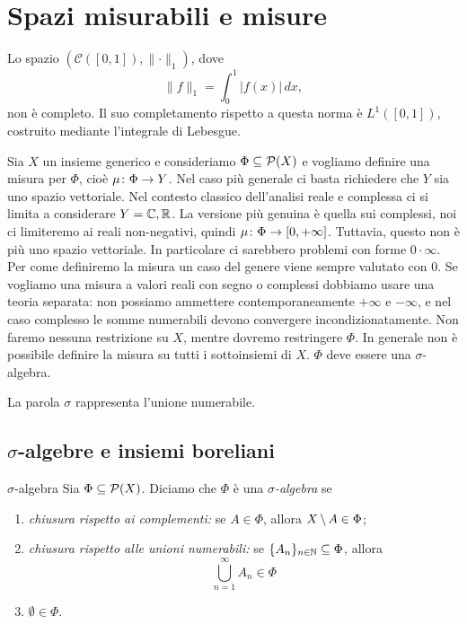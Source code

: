 \documentclass[a4paper]{article}
\begin{document}
\section{Spazi misurabili e misure}

\begin{radioactive}
Lo spazio \((\mathcal C([0,1]), \lVert\cdot\rVert_1)\), dove
\[
    \lVert f\rVert_1 = \int_0^1 |f(x)|\,dx,
\]
non è completo. Il suo completamento rispetto a questa norma è
\(L^1([0,1])\), costruito mediante l'integrale di Lebesgue.

Sia \(X\) un insieme generico e consideriamo \(\Phi \subseteq \mathcal P(X)\)
e vogliamo definire una misura per \(\Phi\), cioè \(\mu \colon \Phi \to Y\).
Nel caso più generale ci basta richiedere che \(Y\) sia uno spazio vettoriale.
Nel contesto classico dell'analisi reale e complessa ci si limita a considerare
\(Y = \mathbb{C}, \mathbb{R}\).
La versione più genuina è quella sui complessi, noi ci limiteremo ai reali non-negativi,
quindi \(\mu \colon \Phi \to [0,+\infty]\).
Tuttavia, questo non è più uno spazio vettoriale.
In particolare ci sarebbero problemi con forme \(0 \cdot \infty\).
Per come definiremo la misura un caso del genere viene sempre valutato con \(0\).
Se vogliamo una misura a valori reali con segno o complessi dobbiamo usare una
teoria separata: non possiamo ammettere contemporaneamente \(+\infty\) e
\(-\infty\), e nel caso complesso le somme numerabili devono convergere
incondizionatamente.
Non faremo nessuna restrizione su \(X\), mentre dovremo restringere \(\Phi\).
In generale non è possibile definire la misura su tutti i sottoinsiemi di \(X\).
\(\Phi\) deve essere una \(\sigma\)-algebra.

La parola \(\sigma\) rappresenta l'unione numerabile.
\end{radioactive}

\subsection{\(\sigma\)-algebre e insiemi boreliani}

\begin{radioactive}
\begin{snippetdefinition}{\(\sigma\)-algebra}
    Sia \(\Phi \subseteq \mathcal P(X)\). Diciamo che \(\Phi\) è una \emph{\(\sigma\)-algebra}
    se
    \begin{enumerate}
        \item \emph{chiusura rispetto ai complementi:} se \(A \in \Phi\), allora \(X \,\backslash\, A \in \Phi\);
        \item \emph{chiusura rispetto alle unioni numerabili:} se \(\{A_n\}_{n \in \mathbb{N}} \subseteq \Phi\), allora
            \[
                \bigcup_{n=1}^\infty A_n \in \Phi
            \]
        \item \(\emptyset \in \Phi\).
    \end{enumerate}
\end{snippetdefinition}
\end{radioactive}
\end{document}
